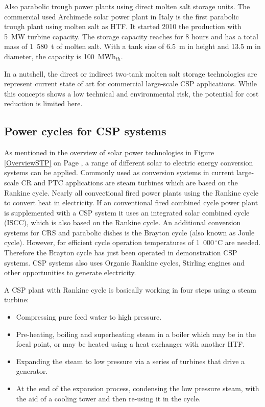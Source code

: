 Also parabolic trough power plants using direct molten salt storage units. The commercial used Archimede solar power plant in Italy is the first parabolic trough plant using molten salt as HTF. It started 2010 the production with 5~MW turbine capacity. The storage capacity reaches for 8 hours and has a total mass of 1~580~t of molten salt. With a tank size of 6.5~m in height and 13.5 m in diameter, the capacity is 100~MWh$_{th}$. \cite{NREL2012}



In a nutshell, the direct or indirect two-tank molten salt storage technologies are represent current state of art for commercial large-scale CSP applications. While this concepts shows a low technical and environmental risk, the potential for cost reduction is limited here. 
\subsection{Power cycles for CSP systems} \label{subsection_powerblock}
As mentioned in the overview of solar power technologies in Figure \ref{OverviewSTP} on Page \pageref{OverviewSTP}, a range of different solar to electric energy conversion systems can be applied. Commonly used as conversion systems in current large-scale CR and PTC applications are steam turbines which are based on the Rankine cycle. Nearly all convectional fired power plants using the Rankine cycle to convert heat in electricity. If an conventional fired combined cycle power plant is supplemented with a CSP system it uses an integrated solar combined cycle (ISCC), which is also based on the Rankine cycle. An additional conversion systems for CRS and parabolic dishes is the Brayton cycle (also known as Joule cycle). However, for efficient cycle operation temperatures of 1~000$\,^{\circ}\mathrm{C}$ are needed. Therefore the Brayton cycle has just been operated in demonstration CSP systems. CSP systems also uses Organic Rankine cycles, Stirling engines and other opportunities to generate electricity. \cite{Lovegrove2012}



A CSP plant with Rankine cycle is basically working in four steps using a steam turbine:
\begin{itemize}
\item Compressing pure feed water to high pressure. 
\item Pre-heating, boiling and superheating steam in a boiler which may be in the focal point, or may be heated using a heat exchanger with another HTF. 
\item Expanding the steam to low pressure via a series of turbines that drive a generator.
\item At the end of the expansion process, condensing the low pressure steam, with the aid of a cooling tower and then re-using it in the cycle.
\end{itemize}
\newpage
